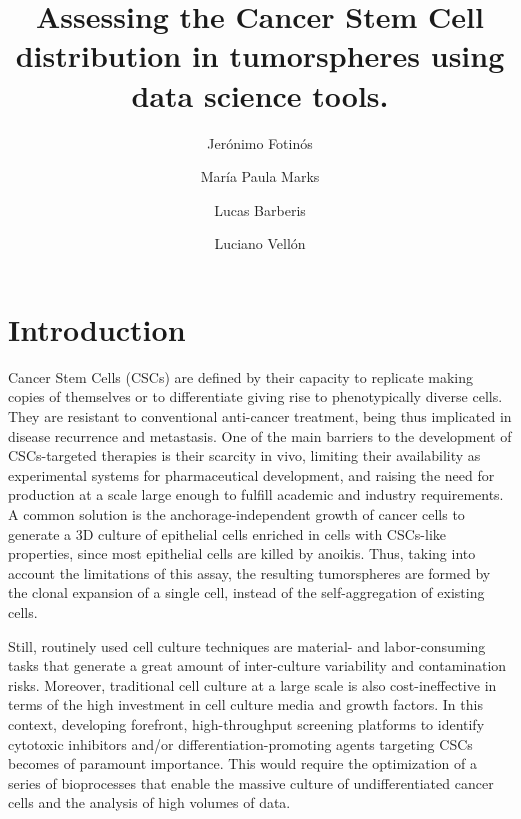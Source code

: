 \documentclass[fleqn,10pt]{wlscirep}
\title{Assessing the Cancer Stem Cell distribution in tumorspheres using data science tools.  }
\author[1]{Jer\'onimo Fotin\'os}
\author[2]{Mar\'ia Paula Marks}
\author[1,*,+]{Lucas Barberis}
\author[2,+]{Luciano Vell\'on}
\affil[1]{IFEG, FAMAF, CONICET, UNC, C\'ordoba, Argentina}
\affil[2]{Stem Cells Lab, IBYME, CONICET, Buenos Aires, Argentina}
\affil[*]{lbarberis@unc.edu.ar}
\affil[+]{these authors contributed equally to this work}
\begin{document}
\flushbottom
\maketitle

\thispagestyle{empty}


\section{Introduction} \label{s: intro}
Cancer Stem Cells (CSCs) are defined by their capacity to replicate making copies of themselves or to differentiate giving rise to phenotypically diverse cells. They are resistant to conventional anti-cancer treatment, being thus implicated in disease recurrence and metastasis\cite{Al-Hajj, Kakarala}. One of the main barriers to the development of CSCs-targeted therapies is their scarcity in vivo, limiting their availability as experimental systems for pharmaceutical development, and raising the need for production at a scale large enough to fulfill academic and industry requirements. A common solution is the anchorage-independent growth of cancer cells to generate a 3D culture of epithelial cells\cite{Dontu} enriched in cells with CSCs-like properties,  since most epithelial cells are killed by anoikis\cite{Ehmsen}. Thus, taking into account the limitations of this assay, the resulting tumorspheres are formed by the clonal expansion of a single cell, instead of the self-aggregation of existing cells\cite{Pastrana}.

Still, routinely used cell culture techniques are material- and labor-consuming tasks that generate a great amount of inter-culture variability and contamination risks. Moreover, traditional cell culture at a large scale is also cost-ineffective in terms of the high investment in cell culture media and growth factors. 
In this context, developing forefront, high-throughput screening platforms to identify cytotoxic inhibitors and/or differentiation-promoting agents targeting CSCs becomes of paramount importance. This would require the optimization of a series of bioprocesses that enable the massive culture of undifferentiated cancer cells and the analysis of high volumes of data. 
\end{document}
